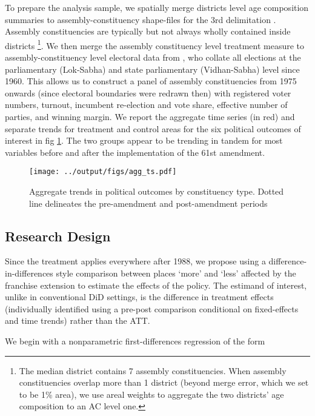 To prepare the analysis sample, we spatially merge districts level age
composition summaries to assembly-constituency shape-files for the 3rd
delimitation \parencite{infomap_vs_maps}. Assembly constituencies are
typically but not always wholly contained inside districts
\footnote{The median district contains 7 assembly constituencies. When
assembly constituencies overlap more than 1 district (beyond merge
error, which we set to be 1\% area), we use areal weights to aggregate
the two districts' age composition to an AC level one. }. We then
merge the assembly constituency level treatment measure to
assembly-constituency level electoral data from
\textcite{Jensenius2017-qf}, who collate all elections at the
parliamentary (Lok-Sabha) and state parliamentary (Vidhan-Sabha) level
since 1960. This allows us to construct a panel of assembly
constituencies from 1975 onwards (since electoral boundaries were
redrawn then) with registered voter numbers, turnout, incumbent
re-election and vote share, effective number of parties, and winning
margin. We report the aggregate time series (in red) and separate
trends for treatment and control areas for the six political outcomes
of interest in fig \ref{fig:agg_trends}. The two groups appear to be
trending in tandem for most variables before and after the
implementation of the 61st amendment.


\begin{figure}[tb]
  \centering
  \texttt{[image: ../output/figs/agg\_ts.pdf]}
  \caption{Aggregate trends in political outcomes by constituency
  type. Dotted line delineates the pre-amendment and post-amendment
  periods}
  \label{fig:agg_trends}
\end{figure}


\subsection{Research Design} %
\label{ssub:research_design}

Since the treatment applies everywhere after 1988, we propose using a
difference-in-differences style comparison between places `more' and
`less' affected by the franchise extension to estimate the effects of
the policy. The estimand of interest, unlike in conventional DiD
settings, is the difference in treatment effects (individually
identified using a pre-post comparison conditional on fixed-effects
and time trends) rather than the ATT.

We begin with a nonparametric first-differences regression of the form

